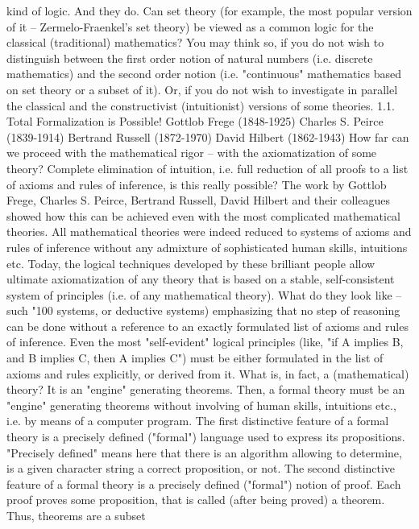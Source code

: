 kind of logic. And they do.
Can set theory (for example, the most popular version of it – Zermelo-Fraenkel's set theory) be viewed as a common logic for
the classical (traditional) mathematics? You may think so, if you do not wish to distinguish between the first order notion of
natural numbers (i.e. discrete mathematics) and the second order notion (i.e. "continuous" mathematics based on set theory or a
subset of it). Or, if you do not wish to investigate in parallel the classical and the constructivist (intuitionist) versions of some
theories.
1.1. Total Formalization is Possible!
Gottlob Frege (1848-1925)
Charles S. Peirce (1839-1914)
Bertrand Russell (1872-1970)
David Hilbert (1862-1943)
How far can we proceed with the mathematical rigor – with the axiomatization of some theory? Complete
elimination of intuition, i.e. full reduction of all proofs to a list of axioms and rules of inference, is this
really possible? The work by Gottlob Frege, Charles S. Peirce, Bertrand Russell, David Hilbert and their
colleagues showed how this can be achieved even with the most complicated mathematical theories. All
mathematical theories were indeed reduced to systems of axioms and rules of inference without any
admixture of sophisticated human skills, intuitions etc. Today, the logical techniques developed by these
brilliant people allow ultimate axiomatization of any theory that is based on a stable, self-consistent
system of principles (i.e. of any mathematical theory).
What do they look like – such "100%
systems, or deductive systems) emphasizing that no step of reasoning can be done without a reference to
an exactly formulated list of axioms and rules of inference. Even the most "self-evident" logical
principles (like, "if A implies B, and B implies C, then A implies C") must be either formulated in the list
of axioms and rules explicitly, or derived from it.
What is, in fact, a (mathematical) theory? It is an "engine" generating theorems. Then, a formal theory
must be an "engine" generating theorems without involving of human skills, intuitions etc., i.e. by means
of a computer program.
The first distinctive feature of a formal theory is a precisely defined ("formal") language used to express
its propositions. "Precisely defined" means here that there is an algorithm allowing to determine, is a
given character string a correct proposition, or not.
The second distinctive feature of a formal theory is a precisely defined ("formal") notion of proof. Each
proof proves some proposition, that is called (after being proved) a theorem. Thus, theorems are a subset
